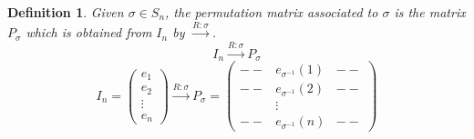\documentclass[12pt]{article}
\theoremstyle{plain}
\newtheorem{definition}{Definition}[subsection]
\begin{document}
\begin{definition}
	Given $\sigma \in S_n$, the permutation matrix associated to $\sigma$ is 
	the matrix $P_{\sigma}$ which is obtained from $I_n$ by 
	$\overset{R:\sigma}{\longrightarrow}$.
	\[
		I_n \overset{R:\sigma}{\longrightarrow} P_{\sigma}
	\]
	\[
		I_n = 
		\begin{pmatrix}
			e_1 \\
			e_2 \\
			\vdots \\
			e_n
		\end{pmatrix}
		\overset{R:\sigma}{\longrightarrow} P_{\sigma}
		=
		\begin{pmatrix}
			-- & e_{\sigma^{-1}}(1) & -- \\
			-- & e_{\sigma^{-1}}(2) & -- \\
			   & \vdots & \\
			-- & e_{\sigma^{-1}}(n) & -- 
		\end{pmatrix}
	\]
\end{definition}
\end{document}
